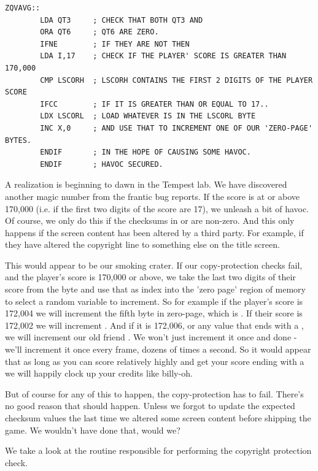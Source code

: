 \begin{lstlisting}
ZQVAVG::
        LDA QT3     ; CHECK THAT BOTH QT3 AND
        ORA QT6     ; QT6 ARE ZERO.
        IFNE        ; IF THEY ARE NOT THEN
        LDA I,17    ; CHECK IF THE PLAYER' SCORE IS GREATER THAN 170,000
        CMP LSCORH  ; LSCORH CONTAINS THE FIRST 2 DIGITS OF THE PLAYER SCORE
        IFCC        ; IF IT IS GREATER THAN OR EQUAL TO 17..
        LDX LSCORL  ; LOAD WHATEVER IS IN THE LSCORL BYTE
        INC X,0     ; AND USE THAT TO INCREMENT ONE OF OUR 'ZERO-PAGE' BYTES.
        ENDIF       ; IN THE HOPE OF CAUSING SOME HAVOC.
        ENDIF       ; HAVOC SECURED.
\end{lstlisting}

A realization is beginning to dawn in the Tempest lab. We have discovered another magic number from the frantic bug reports. If the
score is at or above 170,000 (i.e. if the first two digits of the score are 17), we unleash a bit of havoc. Of course, we only do 
this if the checksums in  or  are non-zero. And this only happens if the screen content has been altered by
a third party. For example, if they have altered the copyright line to something else on the title screen. 

This would appear to be our smoking crater. If our copy-protection checks fail, and the player's score is 170,000 or above, we 
take the last two digits of their score from the byte  and use that as index into the 'zero page' region of memory
to select a random variable to increment. So for example if the player's score is 172,004 we will increment the fifth byte in zero-page,
which is . If their score is 172,002 we will increment . And if it is 172,006, or any value that ends with
a , we will increment our old friend . We won't just increment it once and done - we'll increment it once every
frame, dozens of times a second. So it would appear that as long as you can score relatively highly and get your score ending with a
 we will happily clock up your credits like billy-oh.

But of course for any of this to happen, the copy-protection has to fail. There's no good reason that should happen. Unless we forgot
to update the expected checksum values the last time we altered some screen content before shipping the game. We wouldn't have done
that, would we?

We take a look at the routine responsible for performing the copyright protection check.

